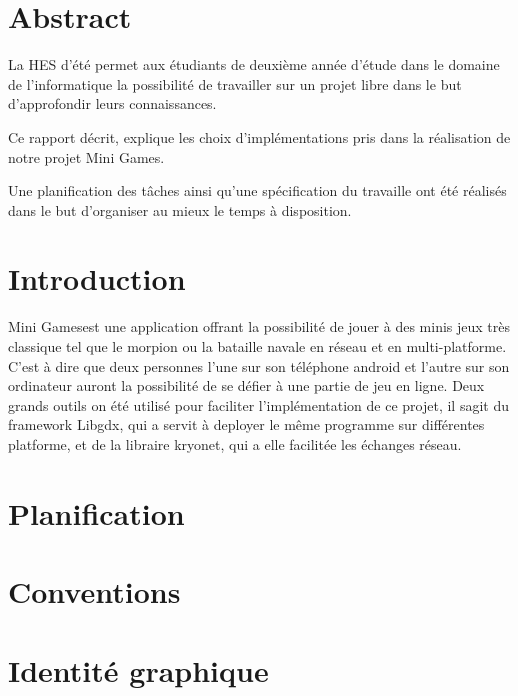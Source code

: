 \documentclass{report}
\title{\projectName}
\author{M. \textsc{Friedli}, A. \textsc{Gillioz}, J. \textsc{Guerne}\\
He-Arc Ingénierie\\
2000 Neuchatel}
\date{\today{}}
\newcommand{\projectName}{Mini Games}
\begin{document}
\maketitle{}
\chapter{Abstract}
La HES d'été permet aux étudiants de deuxième année d'étude dans le domaine de l'informatique
la possibilité de travailler sur un projet libre dans le but d'approfondir leurs connaissances.

Ce rapport décrit, explique les choix d'implémentations pris dans la réalisation de notre
projet \projectName.

Une planification des tâches ainsi qu'une spécification du travaille ont été réalisés dans le but
d'organiser au mieux le temps à disposition.

\tableofcontents

\chapter{Introduction}
\projectName  est une application offrant la possibilité de jouer à des minis jeux très classique tel
que le morpion ou la bataille navale en réseau et en multi-platforme. C'est à dire que deux personnes
l'une sur son téléphone android et l'autre sur son ordinateur auront la possibilité de se défier à une partie de jeu en ligne.
Deux grands outils on été utilisé pour faciliter l'implémentation de ce projet, il sagit du framework Libgdx, qui a servit à
deployer le même programme sur différentes platforme, et de la libraire kryonet, qui a elle facilitée les échanges réseau.

\chapter{Planification}

\chapter{Conventions}

\chapter{Identité graphique}
\end{document}
